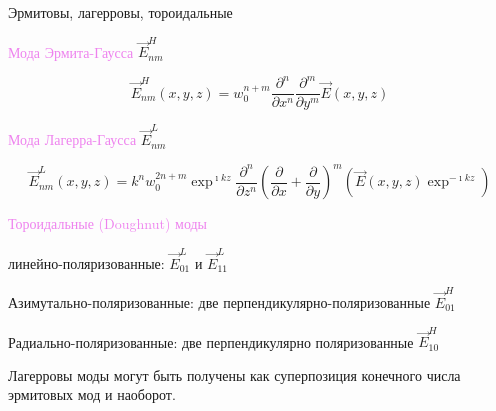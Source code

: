 \documentclass[9pt, compress, xcolor=table]{beamer}
\begin{document}
\begin{frame}{Эрмитовы, лагерровы, тороидальные}

\textcolor{violet}{Мода Эрмита-Гаусса} $\vec E^{H}_{nm}$

\begin{equation*}
\vec E^H_{nm}(x,y,z) = w_0^{n+m}\frac{\partial^n}{\partial x^n}\frac{\partial^m}{\partial y^m}\vec E(x,y,z)
\end{equation*}

\textcolor{violet}{Мода Лагерра-Гаусса} $\vec E^{L}_{nm}$

\begin{equation*}
\vec E^L_{nm}(x,y,z) = k^n w_0^{2n+m} \exp^{\imath k z}\frac{\partial^n}{\partial z^n}
\left(\frac{\partial}{\partial x} + \frac{\partial}{\partial y}\right)^{m}\left(\vec E(x,y,z) \exp^{-\imath k z}\right)
\end{equation*}

\textcolor{violet}{Тороидальные (Doughnut) моды}

линейно-поляризованные: $\vec E^L_{01}$ и $\vec E^L_{11}$

Азимутально-поляризованные:  две перпендикулярно-поляризованные $\vec E^H_{01}$

Радиально-поляризованные: две перпендикулярно поляризованные $\vec E^H_{10}$

Лагерровы моды могут быть получены как суперпозиция конечного числа эрмитовых мод и наоборот.

\end{frame}
\end{document}
